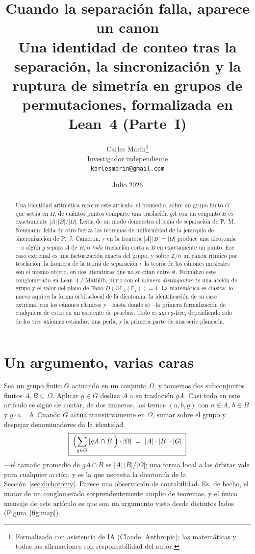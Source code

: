 \documentclass[11pt]{article}
\title{\bf Cuando la separación falla, aparece un canon\\[3pt]
  \large\normalfont Una identidad de conteo tras la separación, la sincronización
  y la ruptura de simetría en grupos de permutaciones, formalizada en Lean~4
  (Parte~I)}
\author{Carles Mar\'in\thanks{Formalizado con asistencia de IA (Claude,
  Anthropic); las matemáticas y todas las afirmaciones son responsabilidad del
  autor.}\\[3pt]
  \normalsize Investigador independiente\\
  \normalsize \texttt{karlesmarin@gmail.com}}
\date{Julio 2026}
\newcommand{\lean}[1]{\texttt{#1}}
\newcommand{\Z}{\mathbb{Z}}
\newcommand{\GL}{\mathrm{GL}}
\begin{document}
\maketitle

\begin{abstract}
Una identidad aritmética recorre este artículo: el promedio, sobre un grupo finito
$G$ que actúa en $\Omega$, de cuántos puntos comparte una traslación $gA$ con un
conjunto $B$ es exactamente $|A|\,|B|/|\Omega|$. Leída de un modo demuestra el lema
de separación de P.~M. Neumann; leída de otro fuerza los teoremas de uniformidad de
la jerarquía de sincronización de P.~J. Cameron; y en la frontera
$|A|\,|B|=|\Omega|$ produce una dicotomía---o algún $g$ separa $A$ de $B$, o
\emph{toda} traslación corta a $B$ en exactamente un punto. Ese caso extremal es una
factorización exacta del grupo, y sobre $\Z/n$ un canon rítmico por teselación: la
frontera de la teoría de separación y la teoría de los cánones musicales son el
mismo objeto, en dos literaturas que no se citan entre sí. Formalizo este
conglomerado en Lean~4 / Mathlib, junto con el \emph{número distinguidor} de una
acción de grupo y el valor del plano de Fano $D(\GL_3(\mathbb{F}_2))=4$. La
matemática es clásica; lo nuevo aquí es la forma órbita-local de la dicotomía, la
identificación de su caso extremal con los cánones rítmicos y---hasta donde
sé---la primera formalización de cualquiera de estos en un asistente de pruebas.
Todo es \lean{sorry}-free, dependiendo solo de los tres axiomas estándar: una perla,
y la primera parte de una serie planeada.
\end{abstract}

\section{Un argumento, varias caras}
\label{sec:intro}

Sea un grupo finito $G$ actuando en un conjunto $\Omega$, y tomemos dos subconjuntos
finitos $A,B\subseteq\Omega$. Aplicar $g\in G$ desliza $A$ a su traslación $gA$.
Casi todo en este artículo se sigue de contar, de dos maneras, las ternas
$(a,b,g)$ con $a\in A$, $b\in B$ y $g\cdot a=b$. Cuando $G$ actúa transitivamente en
$\Omega$, sumar sobre el grupo y despejar denominadores da la identidad
\[
  \boxed{\;\Bigl(\sum_{g\in G}|gA\cap B|\Bigr)\cdot|\Omega|
  \;=\;|A|\cdot|B|\cdot|G|\;}
\]
---el tamaño promedio de $gA\cap B$ es $|A|\,|B|/|\Omega|$; una forma local a las
órbitas vale para cualquier acción, y es la que necesita la dicotomía de la
Sección~\ref{sec:dichotomy}. Parece una observación de
contabilidad. Es, de hecho, el motor de un conglomerado sorprendentemente amplio de
teoremas, y el único mensaje de este artículo es que son un argumento visto desde
distintos lados (Figura~\ref{fig:map}).
\end{document}

